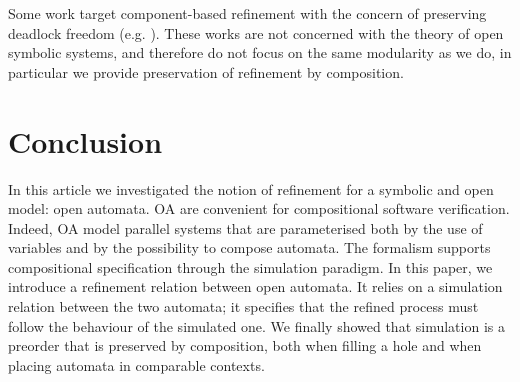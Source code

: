 \documentclass[runningheads]{llncs}
\begin{document}
%

{Some work target component-based refinement  with the concern  of preserving  deadlock freedom (e.g. \cite{DIHEGO2020110598,Kouchnarenko:2007}). These works are not concerned with the theory of open symbolic systems, and therefore do not focus on the same modularity as we do, in particular we provide preservation of refinement by composition.
}
%


  
 





\section{Conclusion}\label{sec:ccl}
In this article we investigated the notion of refinement for a symbolic and open model: open automata. 
OA are convenient for compositional software verification. Indeed, OA  model parallel systems that are parameterised both by the use of variables and by the possibility to compose automata. The formalism supports compositional specification through the simulation paradigm.
In this paper, we introduce a refinement relation  between open automata. It relies on a simulation relation between the two automata;  it  specifies that the refined process must follow the behaviour of the simulated one. We finally showed that simulation is a preorder that is preserved by composition, both when filling a hole and when placing automata in comparable contexts.





 
 
\end{document}

